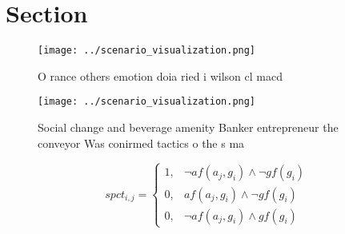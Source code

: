 \documentclass[a4paper]{article}
\begin{document}
\section{Section}

\begin{figure}[H]
\centering
\texttt{[image: ../scenario\_visualization.png]}
\caption{O rance others emotion doia ried i wilson cl macd
}
\end{figure}
 
\begin{figure}
\centering
\texttt{[image: ../scenario\_visualization.png]}
\caption{Social change and beverage amenity Banker entrepreneur the conveyor Was conirmed tactics o the s ma
}
\end{figure}
 
\begin{equation}
spct_{i,j} =
\begin{cases}
1, & \text{$\neg af(a_j,g_i) \wedge \neg gf(g_i)$}\\
0, & \text{$af(a_j,g_i) \wedge \neg gf(g_i)$}\\
0, & \text{$\neg af(a_j,g_i) \wedge gf(g_i)$}
\end{cases}
\end{equation}
\end{document}
